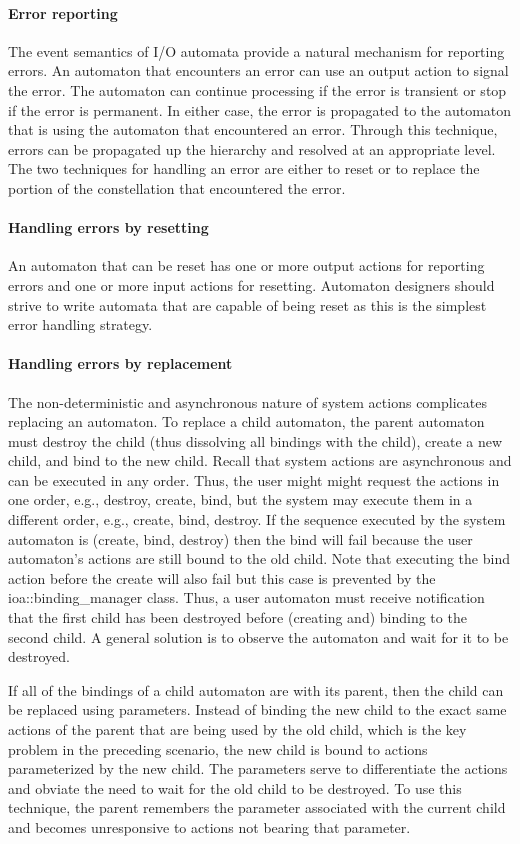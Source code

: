 \paragraph*{Error reporting}
The event semantics of I/O automata provide a natural mechanism for reporting errors.
An automaton that encounters an error can use an output action to signal the error.
The automaton can continue processing if the error is transient or stop if the error is permanent.
In either case, the error is propagated to the automaton that is using the automaton that encountered an error.
Through this technique, errors can be propagated up the hierarchy and resolved at an appropriate level.
The two techniques for handling an error are either to reset or to replace the portion of the constellation that encountered the error.

\paragraph*{Handling errors by resetting}
An automaton that can be reset has one or more output actions for reporting errors and one or more input actions for resetting.
Automaton designers should strive to write automata that are capable of being reset as this is the simplest error handling strategy.

\paragraph*{Handling errors by replacement}
The non-deterministic and asynchronous nature of system actions complicates replacing an automaton.
To replace a child automaton, the parent automaton must destroy the child (thus dissolving all bindings with the child), create a new child, and bind to the new child.
Recall that system actions are asynchronous and can be executed in any order.
Thus, the user might might request the actions in one order, e.g., destroy, create, bind, but the system may execute them in a different order, e.g., create, bind, destroy.
If the sequence executed by the system automaton is (create, bind, destroy) then the bind will fail because the user automaton's actions are still bound to the old child.
Note that executing the bind action before the create will also fail but this case is prevented by the ioa::binding\_manager class.
Thus, a user automaton must receive notification that the first child has been destroyed before (creating and) binding to the second child.
A general solution is to observe the automaton and wait for it to be destroyed.

If all of the bindings of a child automaton are with its parent, then the child can be replaced using parameters.
Instead of binding the new child to the exact same actions of the parent that are being used by the old child, which is the key problem in the preceding scenario, the new child is bound to actions parameterized by the new child.
The parameters serve to differentiate the actions and obviate the need to wait for the old child to be destroyed.
To use this technique, the parent remembers the parameter associated with the current child and becomes unresponsive to actions not bearing that parameter.
